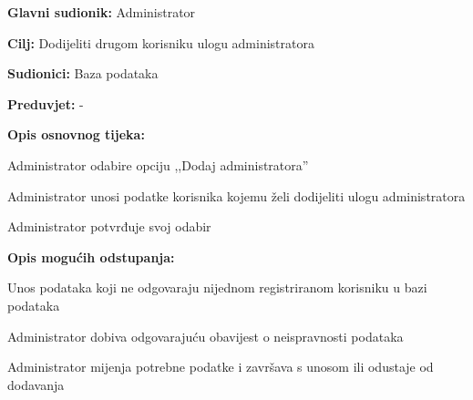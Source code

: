 						\begin{packed_item}
							
							\item \textbf{Glavni sudionik: }Administrator
							\item  \textbf{Cilj: }Dodijeliti drugom korisniku ulogu administratora
							\item  \textbf{Sudionici: }Baza podataka
							\item  \textbf{Preduvjet: }-
							\item  \textbf{Opis osnovnog tijeka:}
							
							\item[] \begin{packed_enum}
								
								\item Administrator odabire opciju ,,Dodaj administratora”
								\item Administrator unosi podatke korisnika kojemu želi dodijeliti ulogu administratora
								\item Administrator potvrđuje svoj odabir
								
							\end{packed_enum}
							\item  \textbf{Opis mogućih odstupanja:}
							
							\item[] \begin{packed_item}
								
								\item[2.a] Unos podataka koji ne odgovaraju nijednom registriranom korisniku u bazi podataka 
								\item[] \begin{packed_enum}
									
									\item Administrator dobiva odgovarajuću obavijest o neispravnosti podataka
									\item Administrator mijenja potrebne podatke i završava s unosom ili odustaje od dodavanja
									
									
								\end{packed_enum}
								
							\end{packed_item}
							
							
						\end{packed_item}
						
